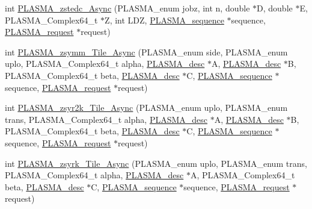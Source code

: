 \begin{DoxyCompactItemize}
\item 
int \hyperlink{group__PLASMA__Complex64__t__Tile__Async_ga5a5fa856181247960356bdd876cdd20e_ga5a5fa856181247960356bdd876cdd20e}{P\+L\+A\+S\+M\+A\+\_\+zstedc\+\_\+\+Async} (P\+L\+A\+S\+M\+A\+\_\+enum jobz, int n, double $\ast$D, double $\ast$E, P\+L\+A\+S\+M\+A\+\_\+\+Complex64\+\_\+t $\ast$Z, int L\+D\+Z, \hyperlink{structplasma__sequence__t}{P\+L\+A\+S\+M\+A\+\_\+sequence} $\ast$sequence, \hyperlink{structplasma__request__t}{P\+L\+A\+S\+M\+A\+\_\+request} $\ast$request)
\item 
int \hyperlink{group__PLASMA__Complex64__t__Tile__Async_gaa2694adeec876b8929856287c5759b6b_gaa2694adeec876b8929856287c5759b6b}{P\+L\+A\+S\+M\+A\+\_\+zsymm\+\_\+\+Tile\+\_\+\+Async} (P\+L\+A\+S\+M\+A\+\_\+enum side, P\+L\+A\+S\+M\+A\+\_\+enum uplo, P\+L\+A\+S\+M\+A\+\_\+\+Complex64\+\_\+t alpha, \hyperlink{structplasma__desc__t}{P\+L\+A\+S\+M\+A\+\_\+desc} $\ast$A, \hyperlink{structplasma__desc__t}{P\+L\+A\+S\+M\+A\+\_\+desc} $\ast$B, P\+L\+A\+S\+M\+A\+\_\+\+Complex64\+\_\+t beta, \hyperlink{structplasma__desc__t}{P\+L\+A\+S\+M\+A\+\_\+desc} $\ast$C, \hyperlink{structplasma__sequence__t}{P\+L\+A\+S\+M\+A\+\_\+sequence} $\ast$sequence, \hyperlink{structplasma__request__t}{P\+L\+A\+S\+M\+A\+\_\+request} $\ast$request)
\item 
int \hyperlink{group__PLASMA__Complex64__t__Tile__Async_ga35bf05742f8cebf8202667213c9f7f3d_ga35bf05742f8cebf8202667213c9f7f3d}{P\+L\+A\+S\+M\+A\+\_\+zsyr2k\+\_\+\+Tile\+\_\+\+Async} (P\+L\+A\+S\+M\+A\+\_\+enum uplo, P\+L\+A\+S\+M\+A\+\_\+enum trans, P\+L\+A\+S\+M\+A\+\_\+\+Complex64\+\_\+t alpha, \hyperlink{structplasma__desc__t}{P\+L\+A\+S\+M\+A\+\_\+desc} $\ast$A, \hyperlink{structplasma__desc__t}{P\+L\+A\+S\+M\+A\+\_\+desc} $\ast$B, P\+L\+A\+S\+M\+A\+\_\+\+Complex64\+\_\+t beta, \hyperlink{structplasma__desc__t}{P\+L\+A\+S\+M\+A\+\_\+desc} $\ast$C, \hyperlink{structplasma__sequence__t}{P\+L\+A\+S\+M\+A\+\_\+sequence} $\ast$sequence, \hyperlink{structplasma__request__t}{P\+L\+A\+S\+M\+A\+\_\+request} $\ast$request)
\item 
int \hyperlink{group__PLASMA__Complex64__t__Tile__Async_ga14c6b9f7fba664c5ae28e70e66ec0617_ga14c6b9f7fba664c5ae28e70e66ec0617}{P\+L\+A\+S\+M\+A\+\_\+zsyrk\+\_\+\+Tile\+\_\+\+Async} (P\+L\+A\+S\+M\+A\+\_\+enum uplo, P\+L\+A\+S\+M\+A\+\_\+enum trans, P\+L\+A\+S\+M\+A\+\_\+\+Complex64\+\_\+t alpha, \hyperlink{structplasma__desc__t}{P\+L\+A\+S\+M\+A\+\_\+desc} $\ast$A, P\+L\+A\+S\+M\+A\+\_\+\+Complex64\+\_\+t beta, \hyperlink{structplasma__desc__t}{P\+L\+A\+S\+M\+A\+\_\+desc} $\ast$C, \hyperlink{structplasma__sequence__t}{P\+L\+A\+S\+M\+A\+\_\+sequence} $\ast$sequence, \hyperlink{structplasma__request__t}{P\+L\+A\+S\+M\+A\+\_\+request} $\ast$request)

\end{DoxyCompactItemize}
